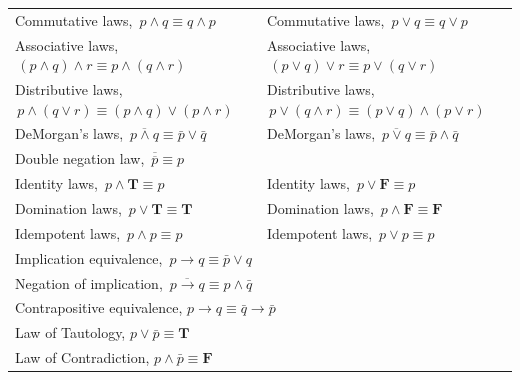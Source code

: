 \begin{table}[h!]
\centering
\renewcommand{\arraystretch}{1.2}
\setlength{\tabcolsep}{8pt}
\begin{tabular}{|p{8.0cm}|p{8.0cm}|}
\hline
\rowcolor[HTML]{E0E0E0}
\multicolumn{2}{|l|}{\textbf{Expression}} \\
\hline
Commutative laws, $\,p \wedge q \equiv q \wedge p$ & Commutative laws, $\,p \vee q \equiv q \vee p$ \\
\hline
Associative laws, $\,(p \wedge q) \wedge r \equiv p \wedge (q \wedge r)$ & Associative laws, $\,(p \vee q) \vee r \equiv p \vee (q \vee r)$ \\
\hline
Distributive laws, $\,p \wedge (q \vee r) \equiv (p \wedge q) \vee (p \wedge r)$ & Distributive laws, $\,p \vee (q \wedge r) \equiv (p \vee q) \wedge (p \vee r)$ \\
\hline
DeMorgan's laws, $\,\overline{p \wedge q} \equiv \bar{p} \vee \bar{q}$ & DeMorgan's laws, $\,\overline{p \vee q} \equiv \bar{p} \wedge \bar{q}$ \\
\hline
\multicolumn{2}{|l|}{Double negation law, $\,\overline{\overline{p}} \equiv p$} \\
\hline
Identity laws, $\,p \wedge \boldsymbol{T} \equiv p$ & Identity laws, $\,p \vee \boldsymbol{F} \equiv p$ \\
\hline
Domination laws, $\,p \vee \boldsymbol{T} \equiv \boldsymbol{T}$ & Domination laws, $\,p \wedge \boldsymbol{F} \equiv \boldsymbol{F}$ \\
\hline
Idempotent laws, $\,p \wedge p \equiv p$ & Idempotent laws, $\,p \vee p \equiv p$ \\
\hline
\multicolumn{2}{|l|}{Implication equivalence, $\,p \rightarrow q \equiv \bar{p} \vee q$} \\
\hline
\multicolumn{2}{|l|}{Negation of implication, $\,\overline{p \rightarrow q} \equiv p \wedge \bar{q}$} \\
\hline
\multicolumn{2}{|l|}{Contrapositive equivalence, $p \rightarrow q \equiv \bar{q} \rightarrow \bar{p}$} \\
\hline
\multicolumn{2}{|l|}{Law of Tautology, $p \vee \bar{p} \equiv \boldsymbol{T}$} \\
\hline
\multicolumn{2}{|l|}{Law of Contradiction, $p \wedge \bar{p} \equiv \boldsymbol{F}$} \\
\hline
\end{tabular}
\end{table}